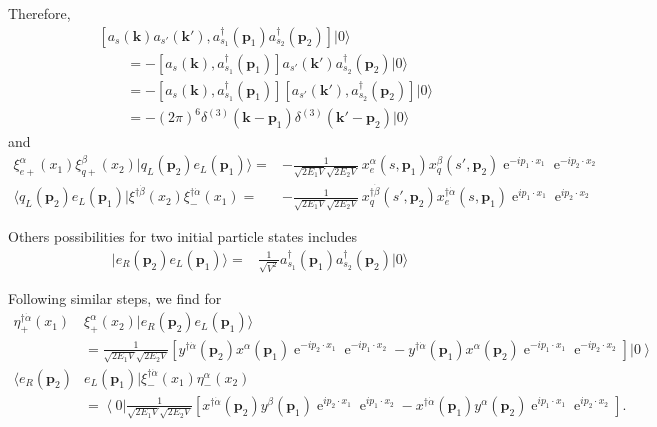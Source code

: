 Therefore,
\begin{align}
&\left[ a_s(\mathbf{k})a_{s'}(\mathbf{k}'),a_{s_1}^\dagger(\mathbf{p}_1)a_{s_2}^\dagger(\mathbf{p}_2)\right] |0\rangle \nonumber\\
&\qquad=
-
 \left[ a_s(\mathbf{k}),a_{s_1}^\dagger(\mathbf{p}_1)\right]a_{s'}(\mathbf{k}')a_{s_2}^\dagger(\mathbf{p}_2) |0\rangle \nonumber\\
&\qquad=-
  \left[ a_s(\mathbf{k}),a_{s_1}^\dagger(\mathbf{p}_1)\right] \left[ a_{s'}(\mathbf{k}'),a_{s_2}^\dagger(\mathbf{p}_2)  \right] |0\rangle \nonumber\\
&\qquad= -(2\pi)^6  
    \delta^{(3)}(\mathbf{k}-\mathbf{p}_1)\delta^{(3)}(\mathbf{k}'-\mathbf{p}_2)|0\rangle
\end{align}
and
\begin{align}
\label{eq:bkqlel}
    \xi^\alpha_{e+}(x_1)\xi^{\beta}_{q+}(x_2)|q_L(\mathbf{p}_2)e_L(\mathbf{p}_1)\rangle=&
-\frac{1}{\sqrt{2E_1 V}\sqrt{2E_2 V}}\,x^\alpha_e(s,\mathbf{p}_1)x^{\beta}_q(s',\mathbf{p}_2)\operatorname{e}^{-i p_1\cdot x_1}\operatorname{e}^{-i p_2\cdot x_2} \nonumber\\
   \langle q_L(\mathbf{p}_2) e_L(\mathbf{p}_1) |\xi^{\dagger\dot{\beta}}(x_2)\xi^{\dagger\dot{\alpha}}_-\left( x_1 \right)=&
-\frac{1}{\sqrt{2E_1 V}\sqrt{2E_2 V}}\,x^{\dagger\dot{\beta}}_q(s',\mathbf{p}_2) x^{\dagger\dot{\alpha}}_e(s,\mathbf{p}_1)\operatorname{e}^{i p_1\cdot x_1}\operatorname{e}^{i p_2\cdot x_2}
\end{align}





Others possibilities for two initial particle states includes
\begin{align}
  |e_R(\mathbf{p}_2)e_L(\mathbf{p}_1)\rangle=&\frac{1}{\sqrt{V^2}}a_{s_1}^\dagger(\mathbf{p}_1)a_{s_2}^\dagger(\mathbf{p}_2)|0\rangle
\end{align}

Following similar steps, we find for
\begin{align}
\eta^{\dagger\dot{\alpha}}_+(x_1)&\xi^{\alpha}_+(x_2)|e_R(\mathbf{p}_2)e_L(\mathbf{p}_1)\rangle
 \nonumber\\
\label{eq:berer}
&=\frac{1 }{\sqrt{2 E_1V}\sqrt{2 E_2V}} \left[ y^{\dagger\dot{\alpha}}(\mathbf{p}_2)x^{\alpha}(\mathbf{p}_1)
\operatorname{e}^{-i p_2\cdot x_1}\operatorname{e}^{-i p_1\cdot x_2}
-y^{\dagger\dot{\alpha}}(\mathbf{p}_1)x^{\alpha}(\mathbf{p}_2)
\operatorname{e}^{-i p_1\cdot x_1}\operatorname{e}^{-i p_2\cdot x_2}   \right] \left|0\right\rangle \\
\langle e_R(\mathbf{p}_2)&e_L(\mathbf{p}_1)| \xi^{\dagger\dot{\alpha}}_-(x_1)\eta^{\alpha}_-(x_2)
 \nonumber\\
\label{eq:berer}
&=\left\langle 0\right|\frac{1 }{\sqrt{2 E_1V}\sqrt{2 E_2V}} \left[ x^{\dagger\dot{\alpha}}(\mathbf{p}_2)y^{\beta}(\mathbf{p}_1)
\operatorname{e}^{i p_2\cdot x_1}\operatorname{e}^{i p_1\cdot x_2}
- x^{\dagger\dot{\alpha}}(\mathbf{p}_1)y^{\alpha}(\mathbf{p}_2)
\operatorname{e}^{i p_1\cdot x_1}\operatorname{e}^{i p_2\cdot x_2}   \right].
\end{align}


